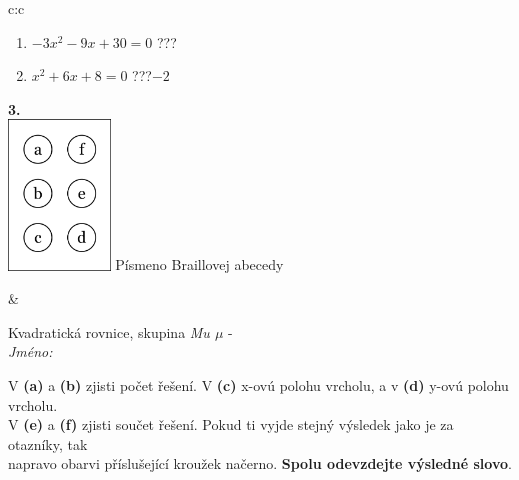 \documentclass[10pt]{report}
\begin{document}
\begin{tabular}{c:c}
\begin{minipage}[c][104.5mm][t]{0.5\linewidth}
\begin{center}
\begin{minipage}{0.79\linewidth}
\begin{center}
\begin{varwidth}{\linewidth}
\begin{enumerate}
\item $-3x^2-9x+30=0$\quad \dotfill\; ???\;\dotfill {}
\item $x^2+6x+8=0$\quad \dotfill\; ???\;\dotfill \quad $-2$
\end{enumerate}
\end{varwidth}
\end{center}
\end{minipage}
\begin{minipage}{0.20\linewidth}
\begin{center}
{\Huge\bfseries 3.} \\[2mm]
\includegraphics[height=40mm]{../images/braille.png}
{\small Písmeno Braillovej abecedy}
\end{center}
\end{minipage}
\end{center}
\end{minipage}
&
\begin{minipage}[c][104.5mm][t]{0.5\linewidth}
\begin{center}
\vspace{7mm}
{\huge Kvadratická rovnice, skupina \textit{Mu $\mu$} -}\\[5mm]
\textit{Jméno:}\phantom{xxxxxxxxxxxxxxxxxxxxxxxxxxxxxxxxxxxxxxxxxxxxxxxxxxxxxxxxxxxxxxxxx}\\[5mm]
\begin{minipage}{0.95\linewidth}
\begin{center}
V \textbf{(a)} a \textbf{(b)} zjisti počet řešení. V \textbf{(c)} x-ovú polohu vrcholu, a v \textbf{(d)} y-ovú polohu vrcholu.\\V \textbf{(e)} a \textbf{(f)} zjisti součet řešení. Pokud ti vyjde stejný výsledek jako je za otazníky, tak\\napravo obarvi příslušející kroužek načerno. \textbf{Spolu odevzdejte výsledné slovo}.
\end{center}
\end{minipage}
\\[1mm]
\begin{minipage}{0.79\linewidth}
\begin{center}

\end{center}
\end{minipage}
\end{center}
\end{minipage}
\end{tabular}
\end{document}
